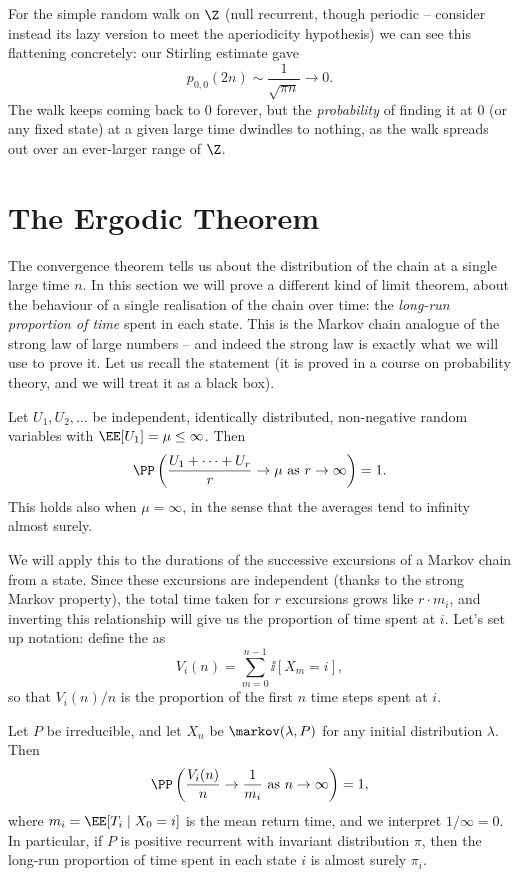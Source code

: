\documentclass[a4paper]{scrartcl}
\begin{document}
\begin{example}
	For the simple random walk on $\Z$ (null recurrent, though periodic -- consider instead its lazy version to meet the aperiodicity hypothesis) we can see this flattening concretely: our Stirling estimate gave
	$$
	p_{0, 0}(2n) \sim \frac{1}{\sqrt{\pi n}} \rightarrow 0.
	$$
	The walk keeps coming back to 0 forever, but the \emph{probability} of finding it at 0 (or any fixed state) at a given large time dwindles to nothing, as the walk spreads out over an ever-larger range of $\Z$.
\end{example}

\section{The Ergodic Theorem}

The convergence theorem tells us about the distribution of the chain at a single large time $n$. In this section we will prove a different kind of limit theorem, about the behaviour of a single realisation of the chain over time: the \emph{long-run proportion of time} spent in each state. This is the Markov chain analogue of the strong law of large numbers -- and indeed the strong law is exactly what we will use to prove it. Let us recall the statement (it is proved in a course on probability theory, and we will treat it as a black box).

\begin{fact}
	Let $U_1, U_2, \dots$ be independent, identically distributed, non-negative random variables with $\EE[U_1] = \mu \leq \infty$. Then
	$$
	\PP\left(\frac{U_1 + \cdots + U_r}{r} \rightarrow \mu \text{ as } r \rightarrow \infty\right) = 1.
	$$
	This holds also when $\mu = \infty$, in the sense that the averages tend to infinity almost surely.
\end{fact}

We will apply this to the durations of the successive excursions of a Markov chain from a state. Since these excursions are independent (thanks to the strong Markov property), the total time taken for $r$ excursions grows like $r \cdot m_i$, and inverting this relationship will give us the proportion of time spent at $i$. Let's set up notation: define the  as
$$
V_i(n) = \sum_{m = 0}^{n - 1} \ii[X_m = i],
$$
so that $V_i(n)/n$ is the proportion of the first $n$ time steps spent at $i$.

\begin{theorem}
	Let $P$ be irreducible, and let $X_n$ be $\markov(\lambda, P)$ for any initial distribution $\lambda$. Then
	$$
	\PP\left(\frac{V_i(n)}{n} \rightarrow \frac{1}{m_i} \text{ as } n \rightarrow \infty \right) = 1,
	$$
	where $m_i = \EE[T_i \mid X_0 = i]$ is the mean return time, and we interpret $1/\infty = 0$. In particular, if $P$ is positive recurrent with invariant distribution $\pi$, then the long-run proportion of time spent in each state $i$ is almost surely $\pi_i$.
\end{theorem}
\end{document}
